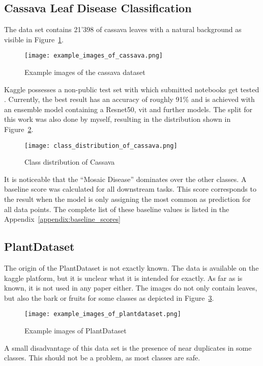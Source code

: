 \subsection{Cassava Leaf Disease Classification}
The data set contains 21'398 of cassava leaves with a natural background as visible in Figure~\ref{fig:example_images_of_cassava}.
\begin{figure}[H]
    \begin{center}
    \texttt{[image: example\_images\_of\_cassava.png]}
    \caption{Example images of the cassava dataset}\label{fig:example_images_of_cassava}
    \end{center}
\end{figure}
Kaggle possesses a non-public test set with which submitted notebooks get tested \autocite{mwebaze2020}. Currently, the best result has an accuracy of roughly 91\% and is achieved with an ensemble model containing a Resnet50, \gls{vit} and further models.  
The split for this work was also done by myself, resulting in the distribution shown in Figure~\ref{fig:class_distribution_of_cassava}.
\begin{figure}[H]
    \begin{center}
    \texttt{[image: class\_distribution\_of\_cassava.png]}
    \caption{Class distribution of Cassava}\label{fig:class_distribution_of_cassava}
    \end{center}
\end{figure}
It is noticeable that the ``Mosaic Disease'' dominates over the other classes. A baseline score was calculated for all downstream tasks. This score corresponds to the result when the model is only assigning the most common as prediction for all data points. The complete list of these baseline values is listed in the Appendix~\ref{appendix:baseline_scores}

\subsection{PlantDataset}
The origin of the PlantDataset is not exactly known. The data is available on the kaggle platform, but it is unclear what it is intended for exactly. As far as is known, it is not used in any paper either.
The images do not only contain leaves, but also the bark or fruits for some classes as depicted in Figure~\ref{fig:example_images_of_plantdataset}.
\begin{figure}[H]
    \begin{center}
    \texttt{[image: example\_images\_of\_plantdataset.png]}
    \caption{Example images of PlantDataset}\label{fig:example_images_of_plantdataset}
    \end{center}
\end{figure}
A small disadvantage of this data set is the presence of near duplicates in some classes. This should not be a problem, as most classes are safe.

